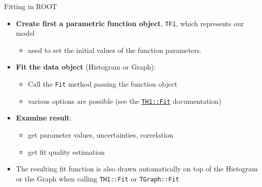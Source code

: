 \documentclass[aspectratio=169]{beamer}
\newcommand{\myhref}[2]{{\color{blue}\href{#1}{\underline{#2}}}}
\begin{document}
\begin{frame}[fragile]{Fitting in ROOT}

\begin{itemize}
    \item{\textcolor{myblue}{\textbf{Create ﬁrst a parametric function object}}, \texttt{TF1}, which represents our model}
    \begin{itemize}
        \item{need to set the initial values of the function parameters.}
    \end{itemize}
    \item{\textcolor{myblue}{\textbf{Fit the data object}} (Histogram or Graph):}
    \begin{itemize}
        \item{Call the \texttt{Fit} method passing the function object}
        \item{various options are possible (see the \texttt{\myhref{https://root.cern.ch/doc/master/classTH1.html\#a63eb028df86bc86c8e20c989eb23fb2a}{TH1::Fit}} documentation)}
    \end{itemize}
    \item{\textcolor{myblue}{\textbf{Examine result}}:}
    \begin{itemize}
        \item{get parameter values, uncertainties, correlation}
        \item{get ﬁt quality estimation}
    \end{itemize}
\item{The resulting ﬁt function is also drawn automatically on top of the Histogram or the Graph when calling \texttt{TH1::Fit} or \texttt{TGraph::Fit}}
\end{itemize}

\end{frame}
\end{document}

